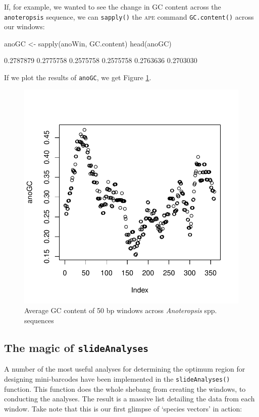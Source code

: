 \documentclass{article}
\newcommand{\progname}[1]{\textsc{#1}}
\newcommand{\fun}[1]{\texttt{#1}}
\begin{document}
If, for example, we wanted to see the change in GC content across the \fun{anoteropsis} sequence, we can \fun{sapply()} the \progname{ape} command \fun{GC.content()} across our windows:

\begin{console}
anoGC <- sapply(anoWin, GC.content)
head(anoGC)
\end{console}
\begin{Routput}
[1] 0.2787879 0.2775758 0.2575758 0.2575758 0.2763636 0.2703030
\end{Routput}

If we plot the results of \fun{anoGC}, we get Figure \ref{slidWin.fig}.

\begin{figure}[tbp]
	\includegraphics{slidWin}
	\caption{Average GC content of 50 bp windows across \emph{Anoteropsis} spp. sequences}
	\label{slidWin.fig}
\end{figure}

\subsection{The magic of \fun{slideAnalyses}}
A number of the most useful analyses for determining the optimum region for designing mini-barcodes \citep{Meus.etal.2008} have been implemented in the \fun{slideAnalyses()} function. This function does the whole shebang from creating the windows, to conducting the analyses. The result is a massive list detailing the data from each window. Take note that this is our first glimpse of `species vectors' in action:
\end{document}
